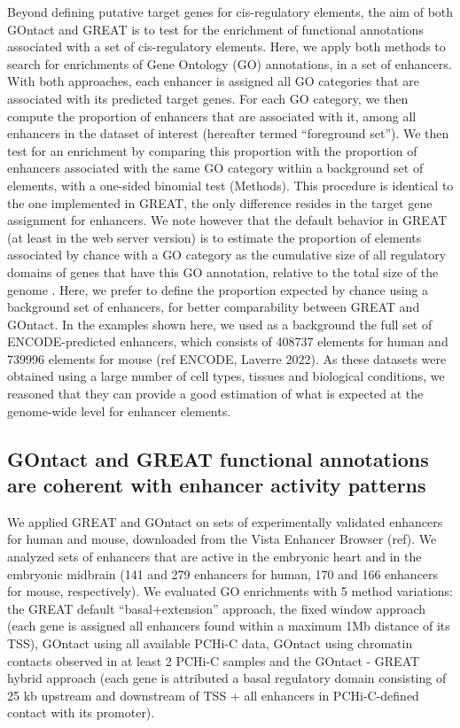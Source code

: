 Beyond defining putative target genes for \acrshort{cis}-regulatory elements, the aim of both GOntact and GREAT is to test for the enrichment of functional annotations associated with a set of  \acrshort{cis}-regulatory elements. Here, we apply both methods to search for enrichments of Gene Ontology (GO) annotations, in a set of enhancers. With both approaches, each enhancer is assigned all GO categories that are associated with its predicted target genes. For each GO category, we then compute the proportion of enhancers that are associated with it, among all enhancers in the dataset of interest (hereafter termed “foreground set”). We then test for an enrichment by comparing this proportion with the proportion of enhancers associated with the same GO category within a background set of elements, with a one-sided binomial test (Methods). This procedure is identical to the one implemented in GREAT, the only difference resides in the target gene assignment for enhancers. We note however that the default behavior in GREAT (at least in the web server version) is to estimate the proportion of elements associated by chance with a GO category as the cumulative size of all regulatory domains of genes that have this GO annotation, relative to the total size of the genome \citep{mclean_great_2010}. Here, we prefer to define the proportion expected by chance using a background set of enhancers, for better comparability between GREAT and GOntact. In the examples shown here, we used as a background the full set of ENCODE-predicted enhancers, which consists of 408737 elements for human and 739996 elements for mouse (ref ENCODE, Laverre 2022). As these datasets were obtained using a large number of cell types, tissues and biological conditions, we reasoned that they can provide a good estimation of what is expected at the genome-wide level for enhancer elements. 

\subsection{GOntact and GREAT functional annotations are coherent with enhancer activity patterns}

We applied GREAT and GOntact on sets of experimentally validated enhancers for human and mouse, downloaded from the Vista Enhancer Browser (ref). We analyzed sets of enhancers that are active in the embryonic heart and in the embryonic midbrain (141 and 279 enhancers for human, 170 and 166 enhancers for mouse, respectively). We evaluated GO enrichments with 5 method variations: the GREAT default “basal+extension” approach, the fixed window approach (each gene is assigned all enhancers found within a maximum 1Mb distance of its TSS), GOntact using all available PCHi-C data, GOntact using chromatin contacts observed in at least 2 PCHi-C samples and the GOntact - GREAT hybrid approach (each gene is attributed a basal regulatory domain consisting of 25 kb upstream and downstream of TSS + all enhancers in PCHi-C-defined contact with its promoter). \\

